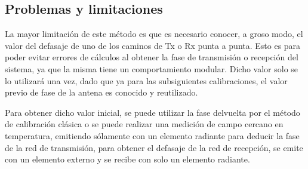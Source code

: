 \subsection{Problemas y limitaciones}

La mayor limitación de este método es que es necesario conocer, a groso modo, el valor del defasaje de uno de los caminos de
Tx o Rx punta a punta. Esto es para poder evitar errores de cálculos al obtener la fase de transmisión o recepción del
sistema, ya que la misma tiene un comportamiento modular. Dicho valor solo se lo utilizará una vez, dado que ya para las
subsiguientes calibraciones, el valor previo de fase de la antena es conocido y reutilizado. 

Para obtener dicho valor inicial, se puede utilizar la fase delvuelta por el método de calibración clásica o se puede realizar
una medición de campo cercano en temperatura, emitiendo sólamente con un elemento radiante para deducir la fase de la red de 
transmisión, para obtener el defasaje de la red de recepción, se emite con un elemento externo y se recibe con solo un elemento
radiante. 
